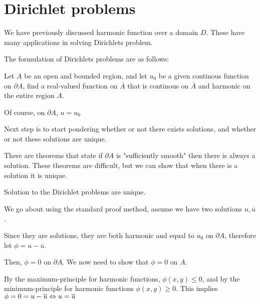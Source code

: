 \section{Dirichlet problems}\par
\noindent We have previously discussed harmonic function over a domain $D$. These have many applications in solving Dirichlets problem.\par
\noindent The formulation of Dirichlets problems are as follows:
\par\bigskip
\begin{theo}{}
  Let $A$ be an open and bounded region, and let $u_0$ be a given continous function on $\partial A$, find a real-valued function on $\overline{A}$  that is continous on $\overline{A}$ and harmonic on the entire region $A$.
  \par\bigskip
  \noindent Of course, on $\partial A$, $u = u_0$
\end{theo}
\par\bigskip
\noindent Next step is to start pondering whether or not there exists solutions, and whether or not these solutions are unique. \par
\noindent There are theorems that state if $\partial A$ is "sufficiently smooth" then there is always a solution. These theorems are difficult, but we can show that when there is a solution it is unique.
\par\bigskip
\begin{theo}{}
  Solution to the Dirichlet problems are unique.
\end{theo}
\par\bigskip
\begin{prf}[]{}
  We go about using the standard proof method, assume we have two solutions $u, \overline{u}$.
  \par\bigskip
  \noindent Since they are solutions, they are both harmonic and equal to $u_0$ on $\partial A$, therefore let $\phi = u-\overline{u}$.\par
  \noindent Then, $\phi = 0$ on $\partial A$. We now need to show that $\phi = 0$ on $A$.
  \par\bigskip
  \noindent By the maximum-principle for harmonic functions, $\phi(x,y)\leq0$, and by the minimum-principle for harmonic functions $\phi(x,y)\geq0$. This implies $\phi = 0 = u-\overline{u}\Leftrightarrow u = \overline{u}$
\end{prf}
\par\bigskip
